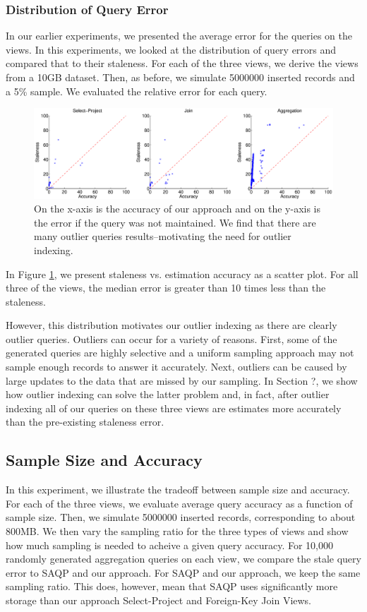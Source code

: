 \subsubsection{Distribution of Query Error}
In our earlier experiments, we presented the average error for the queries on the views.
In this experiments, we looked at the distribution of query errors and compared that to their staleness.
For each of the three views, we derive the views from a 10GB dataset.
Then, as before, we simulate 5000000 inserted records and a 5\% sample.
We evaluated the relative error for each query.

\begin{figure}[ht!]
\label{exp3dist}
\hspace{-3.5em}
 \includegraphics[scale=0.21]{exp/exp3-query-error-dist.eps}
 \caption{On the x-axis is the accuracy of our approach and on the y-axis is the error if the query was not maintained. We find that there are many outlier queries results--motivating the need for outlier indexing.}
\end{figure}

In Figure \ref{exp3dist}, we present staleness vs. estimation accuracy as a scatter plot.
For all three of the views, the median error is greater than 10 times less than the staleness. 

However, this distribution motivates our outlier indexing as there are clearly outlier queries.
Outliers can occur for a variety of reasons.
First, some of the generated queries are highly selective and a uniform sampling approach may not sample enough records to answer it accurately.
Next, outliers can be caused by large updates to the data that are missed by our sampling.
In Section ?, we show how outlier indexing can solve the latter problem and, in fact, after outlier indexing all of our queries on these three views are estimates more accurately than the pre-existing staleness error.

\subsection{Sample Size and Accuracy}
In this experiment, we illustrate the tradeoff between sample size and accuracy.
For each of the three views, we evaluate average query accuracy as a function of sample size.
Then, we simulate 5000000 inserted records, corresponding to about 800MB.
We then vary the sampling ratio for the three types of views and show how much sampling is needed to acheive a given query accuracy.
For 10,000 randomly generated aggregation queries on each view, we compare the stale query error to SAQP and our approach.
For SAQP and our approach, we keep the same sampling ratio.
This does, however, mean that SAQP uses significantly more storage than our approach Select-Project and Foreign-Key Join Views.

